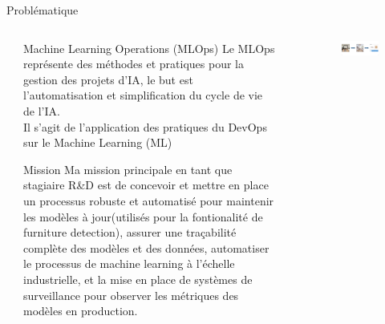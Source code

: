 \documentclass{ENSEIRB_poster}
\begin{document}
\begin{frame}[t]
\begin{columns}[c]
\begin{column}{\onecolwidth}
\begin{block}{Problématique}
      \end{block}
    \end{column}

    \begin{column}{\sepwidth}\end{column} %
  \end{columns}



  \begin{columns}[c]
    \begin{column}{\sepwidth}\end{column} %

    \begin{column}{\fourcolwidth}
      \begin{block}{Machine Learning Operations (MLOps)}
      Le MLOps représente des méthodes et pratiques pour la gestion des projets d’IA, le but est l'automatisation et simplification du cycle de vie de l’IA.\\ Il s'agit de l'application des pratiques du DevOps sur le Machine Learning (ML)
      \end{block}

      \begin{block}{Mission}
        Ma mission principale en tant que stagiaire R\&D est de concevoir et mettre en place un processus robuste et automatisé pour maintenir les modèles à jour(utilisés pour la fontionalité de furniture detection), assurer une traçabilité complète des modèles et des données, automatiser le processus de machine learning à l’échelle industrielle, et la mise en place de systèmes de surveillance pour observer les métriques des modèles en production. 

      \end{block}

    \end{column}

    \begin{column}{\sepwidth}\end{column} %

    \begin{column}{\twocolwidth}
      \vfill
      \begin{figure}
        \includegraphics[width=\textwidth]{templateLatex/logos/furniture detection.png}
      \end{figure}


\end{column}
\end{columns}
\end{frame}
\end{document}
